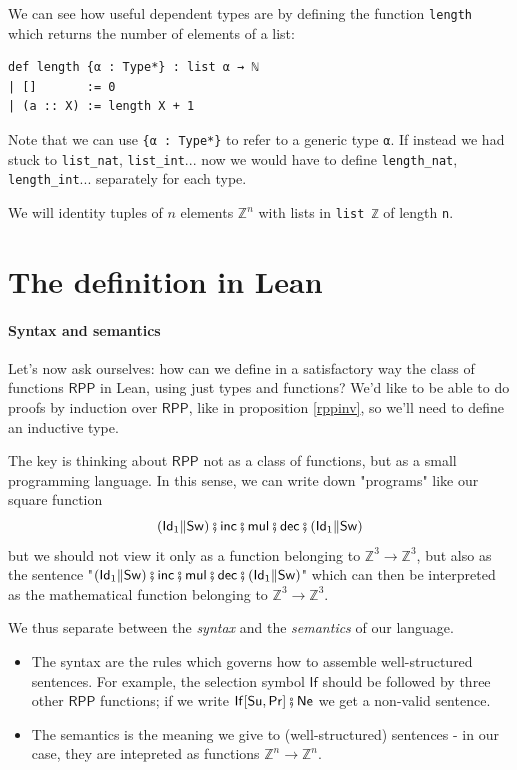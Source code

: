 \documentclass[oneside]{book}
\theoremstyle{definition}
\theoremstyle{remark}
\theoremstyle{plain}
\newcommand{\ZZ}{\mathbb{Z}}
\newcommand{\RPP}{\mathsf{RPP}}
\newcommand{\rppId}{\mathsf{Id}}
\newcommand{\rppNe}{\mathsf{Ne}}
\newcommand{\rppSu}{\mathsf{Su}}
\newcommand{\rppPr}{\mathsf{Pr}}
\newcommand{\rppSw}{\mathsf{Sw}}
\newcommand{\rppCo}{\fatsemi}
\newcommand{\rppPa}{\Vert}
\newcommand{\rppIf}{\mathsf{If}}
\newcommand{\rppinc}{\mathsf{inc}}
\newcommand{\rppdec}{\mathsf{dec}}
\newcommand{\rppmul}{\mathsf{mul}}
\begin{document}
We can see how useful dependent types are by defining the function \lstinline{length}
which returns the number of elements of a list:
\begin{lstlisting}
def length {α : Type*} : list α → ℕ
| []       := 0
| (a :: X) := length X + 1
\end{lstlisting}
Note that we can use \lstinline|{α : Type*}| to refer to a generic type \lstinline{α}.
If instead we had stuck to \lstinline{list_nat}, \lstinline{list_int}...
now we would have to define \lstinline{length_nat}, \lstinline{length_int}... separately for each type.

We will identity tuples of $n$ elements $\ZZ^n$ with lists in \lstinline{list ℤ} of length \lstinline{n}.

\section{The definition in Lean}

\paragraph{Syntax and semantics}
Let's now ask ourselves: how can we define in a satisfactory way the class of functions $\RPP$ in Lean,
using just types and functions?
We'd like to be able to do proofs by induction over $\RPP$, like in proposition \ref{rppinv}, so we'll need to define an inductive type.

The key is thinking about $\RPP$ not as a class of functions, but as a small programming language.
In this sense, we can write down "programs" like our square function
\[(\rppId_1 \rppPa \rppSw) \rppCo \rppinc \rppCo \rppmul \rppCo \rppdec \rppCo (\rppId_1 \rppPa \rppSw)\]
but we should not view it only as a function belonging to $\ZZ^3 \to \ZZ^3$,
but also as the sentence
"$(\rppId_1 \rppPa \rppSw) \rppCo \rppinc \rppCo \rppmul \rppCo \rppdec \rppCo (\rppId_1 \rppPa \rppSw)$"
which can then be interpreted as the mathematical function belonging to $\ZZ^3 \to \ZZ^3$.

We thus separate between the \textit{syntax} and the \textit{semantics} of our language.
\begin{itemize}
\item The syntax are the rules which governs how to assemble well-structured sentences.
For example, the selection symbol $\rppIf$ should be followed by three other $\RPP$ functions;
if we write $\rppIf[\rppSu, \rppPr] \rppCo \rppNe$ we get a non-valid sentence.
\item The semantics is the meaning we give to (well-structured) sentences -
in our case, they are intepreted as functions $\ZZ^n \to \ZZ^n$.
\end{itemize}
\end{document}
